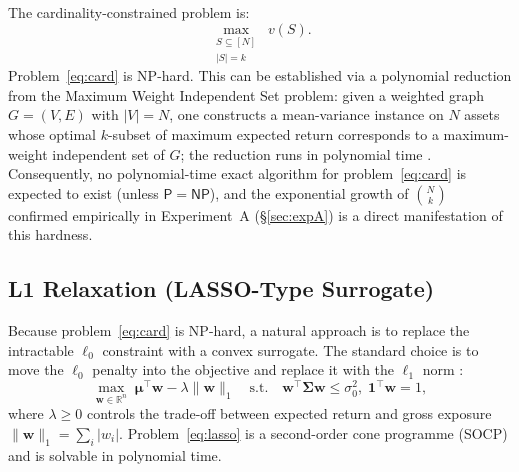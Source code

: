 \documentclass[11pt]{article}
\begin{document}
The cardinality-constrained problem is:
\begin{equation}
  \max_{\substack{S\subseteq[N] \\ |S|=k}}\; v(S).
  \label{eq:card}
\end{equation}
Problem~\eqref{eq:card} is NP-hard.  This can be established via a polynomial
reduction from the Maximum Weight Independent Set problem: given a weighted graph
$G=(V,E)$ with $|V|=N$, one constructs a mean-variance instance on $N$ assets
whose optimal $k$-subset of maximum expected return corresponds to a maximum-weight
independent set of $G$; the reduction runs in polynomial time
\cite{GareyJohnson1979}.  Consequently, no polynomial-time exact algorithm for
problem~\eqref{eq:card} is expected to exist (unless $\mathsf{P}=\mathsf{NP}$),
and the exponential growth of $\binom{N}{k}$ confirmed empirically in
Experiment~A (\S\ref{sec:expA}) is a direct manifestation of this hardness.



\subsection{L1 Relaxation (LASSO-Type Surrogate)}
\label{sec:lasso_theory}

Because problem~\eqref{eq:card} is NP-hard, a natural approach is to replace
the intractable $\ell_0$ constraint with a convex surrogate.  The standard choice
is to move the $\ell_0$ penalty into the objective and replace it with the $\ell_1$
norm \cite{Tibshirani1996}:
\begin{equation}
  \max_{\mathbf{w}\in\mathbb{R}^n}\;
    \boldsymbol{\mu}^\top\mathbf{w} - \lambda\|\mathbf{w}\|_1
  \quad\text{s.t.}\quad
  \mathbf{w}^\top\boldsymbol{\Sigma}\mathbf{w}\leq\sigma_0^2,\;
  \mathbf{1}^\top\mathbf{w}=1,
  \label{eq:lasso}
\end{equation}
where $\lambda\geq 0$ controls the trade-off between expected return and gross
exposure $\|\mathbf{w}\|_1 = \sum_i|w_i|$.  Problem~\eqref{eq:lasso} is a
second-order cone programme (SOCP) and is solvable in polynomial time.
\end{document}
